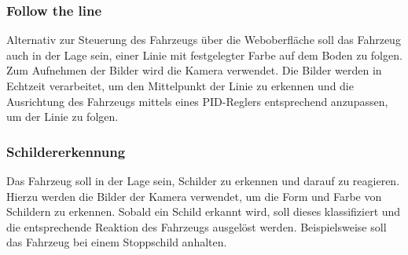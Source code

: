         \subsubsection{Follow the line} 
        Alternativ zur Steuerung des Fahrzeugs über die Weboberfläche soll das Fahrzeug auch in der Lage sein, einer Linie mit festgelegter Farbe auf dem Boden zu folgen. Zum Aufnehmen der Bilder wird die Kamera verwendet. Die Bilder werden in Echtzeit verarbeitet, um den Mittelpunkt der Linie zu erkennen und die Ausrichtung des Fahrzeugs mittels eines PID-Reglers entsprechend anzupassen, um der Linie zu folgen.

        \subsubsection{Schildererkennung}
        Das Fahrzeug soll in der Lage sein, Schilder zu erkennen und darauf zu reagieren. Hierzu werden die Bilder der Kamera verwendet, um die Form und Farbe von Schildern zu erkennen. Sobald ein Schild erkannt wird, soll dieses klassifiziert und die entsprechende Reaktion des Fahrzeugs ausgelöst werden. Beispielsweise soll das Fahrzeug bei einem Stoppschild anhalten.

